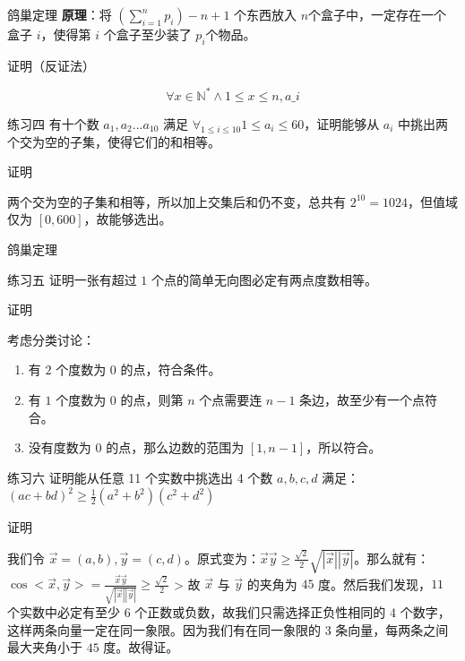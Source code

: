 \documentclass[UTF8]{beamer}
\begin{document}
    \begin{frame}{鸽巢定理}
      \textbf{原理}：将 \((\sum\limits_{i=1}^{n}p_i)-n+1\) 个东西放入 \(n\)个盒子中，一定存在一个盒子 \(i\)，使得第 \(i\) 个盒子至少装了 \(p_i\)个物品。

      证明（反证法）

      \[ \forall x\in \mathbb{N^* } \land 1\le x \le n,a\_i \]
      \pause
      \begin{block}{练习四}\label{ux7ec3ux4e60ux56db}
        有十个数 \(a_1,a_2...a_10\) 满足
        \(\forall_{1\le i\le 10}1\le a_i\le 60\)，证明能够从 \(a_i\)
        中挑出两个交为空的子集，使得它们的和相等。
      \end{block}
      \pause
      证明

      两个交为空的子集和相等，所以加上交集后和仍不变，总共有
      \(2^{10}=1024\)，但值域仅为 \([0,600]\)，故能够选出。
    \end{frame}

    \begin{frame}{鸽巢定理}
      \begin{block}{练习五}\label{ux7ec3ux4e60ux4e94}
      证明一张有超过 \(1\) 个点的简单无向图必定有两点度数相等。
      \end{block}
      \pause
      证明

      考虑分类讨论：

      \begin{enumerate}
        \def\labelenumi{\arabic{enumi}.}
        \item
          有 \(2\) 个度数为 \(0\) 的点，符合条件。
        \item
          有 \(1\) 个度数为 \(0\) 的点，则第 \(n\) 个点需要连 \(n-1\)
          条边，故至少有一个点符合。
        \item
          没有度数为 \(0\) 的点，那么边数的范围为 \([1,n-1]\)，所以符合。
      \end{enumerate}
    \end{frame}

    \begin{frame}
      \begin{block}{练习六}\label{ux7ec3ux4e60ux516d}
        证明能从任意 11 个实数中挑选出 4 个数 \(a,b,c,d\) 满足：
        \((ac+bd)^2\geq\frac 1 2(a^2+b^2)(c^2+d^2)\)
      \end{block}
      \pause
      证明
      
      我们令
      \(\overrightarrow x=(a,b),\overrightarrow y=(c,d)\)。原式变为：\(\overrightarrow x \overrightarrow y \ge \frac{\sqrt{2}}{2}\sqrt{|\overrightarrow x||\overrightarrow y|}\)。那么就有：\(\cos<\overrightarrow x,\overrightarrow y>=\frac{\overrightarrow x \overrightarrow y}{\sqrt{|\overrightarrow x||\overrightarrow y|}} \ge \frac{\sqrt{2}}{2}\)
      \textgreater{} 故 \(\overrightarrow x\) 与 \(\overrightarrow y\)
      的夹角为 \(45\) 度。然后我们发现，\(11\) 个实数中必定有至少 \(6\)
      个正数或负数，故我们只需选择正负性相同的 \(4\)
      个数字，这样两条向量一定在同一象限。因为我们有在同一象限的 \(3\)
      条向量，每两条之间最大夹角小于 \(45\) 度。故得证。

    \end{frame}
\end{document}
